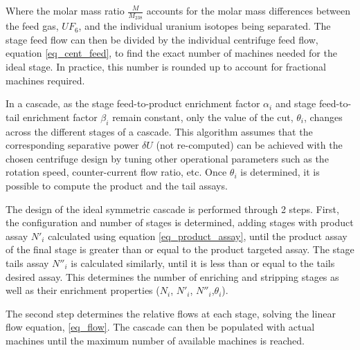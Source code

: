Where the molar mass ratio $\frac{M}{M_{238}}$ accounts for the molar mass
differences between the feed gas, $UF_6$, and the individual uranium isotopes
being separated. The stage feed flow can then be divided by the individual
centrifuge feed flow, equation \eqref{eq_cent_feed}, to find the exact number of
machines needed for the ideal stage. In practice, this number is rounded up to
account for fractional machines required.


In a cascade, as the stage feed-to-product enrichment factor $\alpha_{i}$ and stage feed-to-tail enrichment factor $\beta_{i}$ remain constant, only the value of
the cut, $\theta_{i}$, changes across the different stages of a cascade.  This
algorithm assumes that the corresponding separative power $\delta U$ (not
re-computed) can be achieved with the chosen centrifuge design by tuning other
operational parameters such as the rotation speed, counter-current flow
ratio, etc.  Once $\theta_{i}$ is determined, it is possible to compute the
product and the tail assays.


The design of the ideal symmetric cascade is performed through 2 steps. First,
the configuration and number of stages is determined, adding stages with product assay $N'_i$ calculated using equation \ref{eq_product_assay}, until the
product assay of the final stage is greater than or equal to the product targeted assay. The stage tails assay $N''_i$ is calculated similarly, until it is less than or equal to the tails desired assay.  This determines the number of enriching and stripping stages as well as their enrichment properties ($N_{i}$, $N'_{i}$, $N''_{i}$,$\theta_{i}$).


The second step determines the relative flows at each stage, solving the linear
flow equation, \eqref{eq_flow}.
The cascade can then be populated with actual machines until the maximum number
of available machines is reached.

